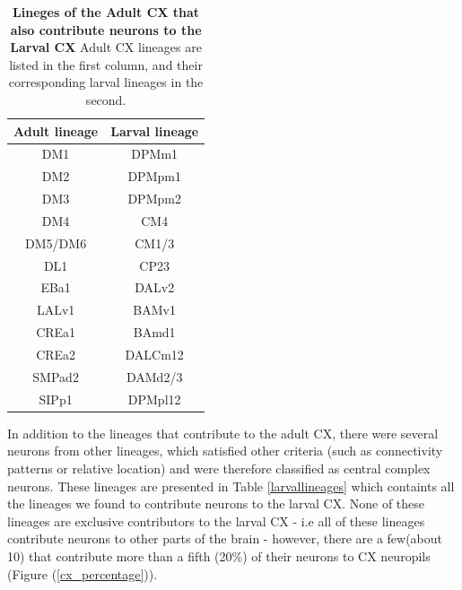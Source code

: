    \begin{table}
    \centering
    \begin{tabular}{|c|c|}
    \hline
    Adult lineage & Larval lineage \\
    \hline
    DM1 & DPMm1 \\
    DM2 & DPMpm1 \\
    DM3 & DPMpm2 \\
    DM4 & CM4 \\
    DM5/DM6 & CM1/3 \\
    DL1 & CP23 \\
    EBa1 & DALv2 \\
    LALv1 & BAMv1 \\
    CREa1 & BAmd1 \\
    CREa2 & DALCm12 \\
    SMPad2 & DAMd2/3 \\
    SIPp1 & DPMpl12 \\
    \bottomrule
    \end{tabular}
    \caption[Lineges of the Adult CX that also contribute neurons to the Larval CX]{\textbf{Lineges of the Adult CX that also contribute neurons to the Larval CX} Adult CX lineages are listed in the first column, and their corresponding larval lineages in the second.}
    \label{lineagemap}
    \end{table}



In addition to the lineages that contribute to the adult CX, there were several neurons from other lineages, which satisfied other criteria (such as connectivity patterns or relative location) and were therefore classified as central complex neurons. These lineages are presented in Table \ref{larvallineages} which containts all the lineages we found to contribute neurons to the larval CX. None of these lineages are exclusive contributors to the larval CX - i.e all of these lineages contribute neurons to other parts of the brain - however, there are a few(about 10) that contribute more than a fifth (20\%) of their neurons to CX neuropils (Figure (\ref{cx_percentage})).



